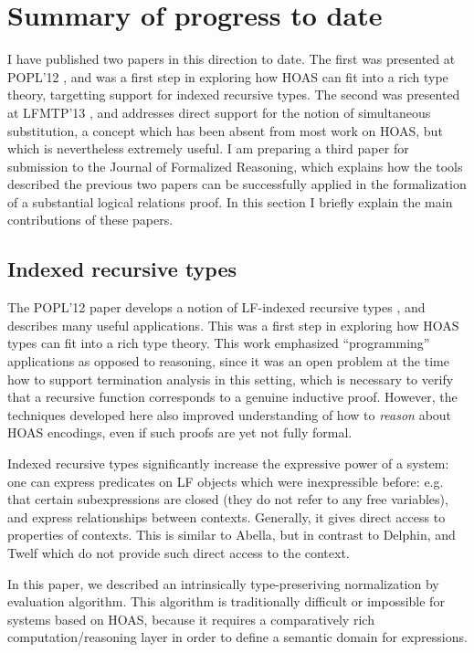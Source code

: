 \documentclass{article}
\begin{document}
\section{Summary of progress to date}
I have published two papers in this direction to date. The first
was presented at POPL'12 \citep{Cave12} , and was a first step in
exploring how HOAS can fit into a rich type theory, targetting support
for indexed recursive types. The second was presented at LFMTP'13
\citep{Cave13}, and addresses direct support for the notion of
simultaneous substitution, a concept which has been absent from most
work on HOAS, but which is nevertheless extremely useful. I am
preparing a third paper \citep{Cave14} for submission to the Journal
of Formalized Reasoning, which explains how the tools described the
previous two papers can be successfully applied in the formalization
of a substantial logical relations proof. In this
section I briefly explain the main contributions of these papers.

\subsection{Indexed recursive types}
The POPL'12 paper develops a notion of LF-indexed recursive types
\citep{Cave12}, and describes many useful applications. This was a
first step in exploring how HOAS types can fit
into a rich type theory. This work emphasized ``programming'' applications
as opposed to reasoning, since it was an open problem at the time how
to support termination analysis in this setting, which is necessary to
verify that a recursive function corresponds to a genuine inductive proof. However, the techniques
developed here also improved understanding of how to \emph{reason} about
HOAS encodings, even if such proofs are yet not fully formal.

Indexed recursive types significantly increase the expressive power of a system: one can express
predicates on LF objects which were inexpressible before: e.g. that
certain subexpressions are closed (they do not refer to any free variables), and express relationships between
contexts. Generally, it gives direct access to properties of
contexts. This is similar to Abella, but in contrast to Delphin, and Twelf which do not
provide such direct access to the context.

In this paper, we described an intrinsically type-preseriving
normalization by evaluation algorithm. This algorithm is traditionally
difficult or impossible for systems based on HOAS, because it requires
a comparatively rich computation/reasoning layer in order to define a semantic domain for expressions.
\end{document}
